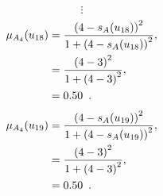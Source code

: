 \documentclass[a4paper,openany]{book}
\begin{document}
				\[
					\vdots
				\]
				\begin{align}
					\mu_{A_4}(u_{18}) &= \frac{\left(4-s_A(u_{18})\right)^2}{1 + \left(4-s_A(u_{18})\right)^2} ,\\
					&= \frac{\left(4-3\right)^2}{1 + \left(4-3\right)^2} \notag ,\\
					&= 0.50 \enspace. \notag
				\end{align}
				\begin{align}
					\mu_{A_4}(u_{19}) &= \frac{\left(4-s_A(u_{19})\right)^2}{1 + \left(4-s_A(u_{19})\right)^2} ,\\
					&= \frac{\left(4-3\right)^2}{1 + \left(4-3\right)^2} \notag ,\\
					&= 0.50 \enspace. \notag
				\end{align}
\end{document}
